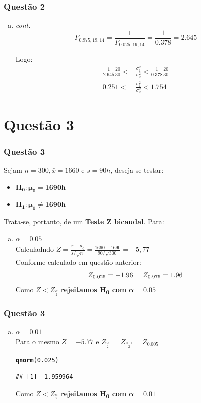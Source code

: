 \documentclass{beamer}\usepackage[]{graphicx}\usepackage[]{color}
\makeatletter
\newcommand{\hlnum}[1]{\textcolor[rgb]{0.686,0.059,0.569}{#1}}%
\newcommand{\hlstd}[1]{\textcolor[rgb]{0.345,0.345,0.345}{#1}}%
\newcommand{\hlkwd}[1]{\textcolor[rgb]{0.737,0.353,0.396}{\textbf{#1}}}%
\newenvironment{kframe}{%
 \def\at@end@of@kframe{}%
 \ifinner\ifhmode%
  \def\at@end@of@kframe{\end{minipage}}%
  \begin{minipage}{\columnwidth}%
 \fi\fi%
 \def\FrameCommand##1{\hskip\@totalleftmargin \hskip-\fboxsep
 \colorbox{shadecolor}{##1}\hskip-\fboxsep
     \hskip-\linewidth \hskip-\@totalleftmargin \hskip\columnwidth}%
 \MakeFramed {\advance\hsize-\width
   \@totalleftmargin\z@ \linewidth\hsize
   \@setminipage}}%
 {\par\unskip\endMakeFramed%
 \at@end@of@kframe}
\newenvironment{knitrout}{}{} %
\makeatother
\begin{document}
	\begin{frame}
		\frametitle{Questão 2}
		\begin{enumerate}[b)]
			\item \textit{cont.}\\
			$$F_{0.975,19,14} = \frac{1}{F_{0.025,19,14}} = \frac{1}{0.378} = 2.645$$
			
			Logo:
			\begin{align*}
				\frac{1}{2.645}\frac{20}{30} < &\frac{\sigma_{1}^{2}}{\sigma_{2}^{2}} < \frac{1}{0.378}\frac{20}{30}\\ 0.251 < &\frac{\sigma_{1}^{2}}{\sigma_{2}^{2}} < 1.754
			\end{align*}
		\end{enumerate}	
	\end{frame}
	
	\section{Questão 3}
	\begin{frame}
			\frametitle{Questão 3}
			Sejam $n = 300, \bar{x} = 1660$ e $s = 90h$, deseja-se testar:
			\begin{itemize}
				\item $\boldsymbol{H_{0}:  \mu_{0} = 1690h}$
				\item $\boldsymbol{H_{1}:  \mu_{0} \neq 1690h}$
			\end{itemize}
			Trata-se, portanto, de um \textbf{Teste Z bicaudal}.  Para:
			\begin{enumerate}[a)]
				\item $\alpha = 0.05$\\
				Calculadndo $Z = \frac{\bar{x} - \mu_{0}}{s/\sqrt{n}} = \frac{1660-1690}{90/\sqrt{300}} = -5,77$\\
				Conforme calculado em questão anterior:$$Z_{0.025} = -1.96 \hspace{0.5cm}Z_{0.975} = 1.96$$ 
				Como $ Z < Z_{\frac{\alpha}{2}}$ \textbf{rejeitamos H\textsubscript{0} com} $\boldsymbol{\alpha = 0.05}$  
			\end{enumerate}
		\end{frame}
		
		\begin{frame}[fragile]
			\frametitle{Questão 3}
			\begin{enumerate}[b)]
				\item $\alpha = 0.01$\\
				Para o mesmo $Z = -5.77$ e $Z_{\frac{\alpha}{2}} \ = Z_{\frac{0.01}{2}} = Z_{0.005} $
\begin{knitrout}
\color{fgcolor}\begin{kframe}
\begin{alltt}
\hlkwd{qnorm}\hlstd{(}\hlnum{0.025}\hlstd{)}
\end{alltt}
\begin{verbatim}
## [1] -1.959964
\end{verbatim}
\end{kframe}
\end{knitrout}
			Como $Z < Z_{\frac{\alpha}{2} }$ \textbf{rejeitamos H\textsubscript{0} com} $\boldsymbol{\alpha = 0.01}$
			\end{enumerate}
		\end{frame}
\end{document}

